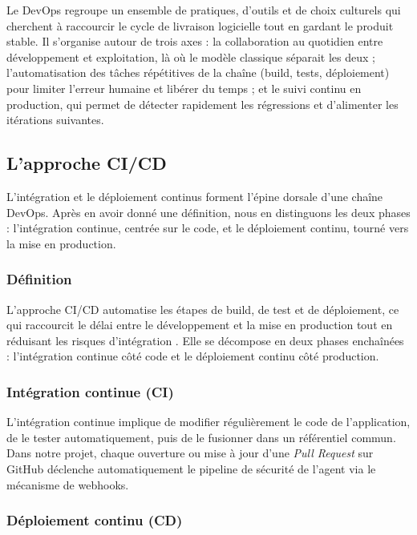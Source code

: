        Le DevOps regroupe un ensemble de pratiques, d'outils et de choix culturels qui
        cherchent à raccourcir le cycle de livraison logicielle tout en gardant le produit
        stable. Il s'organise autour de trois axes : la collaboration au quotidien entre
        développement et exploitation, là où le modèle classique séparait les deux ;
        l'automatisation des tâches répétitives de la chaîne (build, tests, déploiement)
        pour limiter l'erreur humaine et libérer du temps ; et le suivi continu en
        production, qui permet de détecter rapidement les régressions et d'alimenter les
        itérations suivantes.

    \subsection{L'approche CI/CD}

        L'intégration et le déploiement continus forment l'épine dorsale d'une chaîne
        DevOps. Après en avoir donné une définition, nous en distinguons les deux phases :
        l'intégration continue, centrée sur le code, et le déploiement continu, tourné vers
        la mise en production.

        \subsubsection{Définition}

        L'approche CI/CD automatise les étapes de build, de test et de déploiement, ce
        qui raccourcit le délai entre le développement et la mise en production tout en
        réduisant les risques d'intégration \cite{DevSecOps}. Elle se décompose en deux
        phases enchaînées : l'intégration continue côté code et le déploiement continu
        côté production.

        \subsubsection{Intégration continue (CI)}

        L'intégration continue implique de modifier régulièrement le code de l'application,
        de le tester automatiquement, puis de le fusionner dans un référentiel commun. Dans
        notre projet, chaque ouverture ou mise à jour d'une \textit{Pull Request} sur GitHub
        déclenche automatiquement le pipeline de sécurité de l'agent via le mécanisme de
        webhooks.

        \subsubsection{Déploiement continu (CD)}

